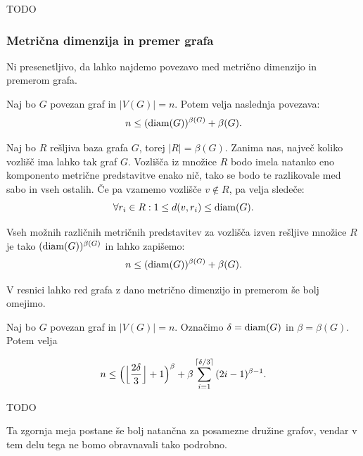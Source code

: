 \documentclass[mat1, tisk]{fmfdelo}
\newcommand{\1}{(1, 1, ..., 1)}
\newcommand{\2}{(2, 2, ..., 2)}
\begin{document}
\begin{dokaz}
    TODO
\end{dokaz}




\subsubsection{Metrična dimenzija in premer grafa} \label{ss:mdim_premer}

Ni presenetljivo, da lahko najdemo povezavo med metrično dimenzijo in premerom grafa.

\begin{trditev}\label{trd:groba_meja_mdim_premer}
    Naj bo $G$ povezan graf in $|V(G)| = n$. Potem velja naslednja povezava:
    $$n \leq ({\rm diam}(G))^{\beta (G)} + \beta (G). $$
\end{trditev}

\begin{dokaz}
    Naj bo $R$ rešljiva baza grafa $G$, torej $|R| = \beta(G).$ Zanima nas, največ koliko 
    vozlišč ima lahko tak graf $G$. Vozlišča iz množice $R$ bodo imela natanko eno 
    komponento metrične predstavitve enako nič, tako se bodo te razlikovale med sabo in 
    vseh ostalih. Če pa vzamemo vozlišče $v \notin R$, pa velja sledeče:
    $$\forall r_i \in R: 1 \leq d(v, r_i) \leq {\rm diam}(G).$$
    
    Vseh možnih različnih metričnih predstavitev za vozlišča izven rešljive množice $R$ 
    je tako $({\rm diam}(G))^{\beta (G)}$
    in lahko zapišemo:
    $$n \leq ({\rm diam}(G))^{\beta (G)} + \beta (G).$$
\end{dokaz}

V resnici lahko red grafa z dano metrično dimenzijo in premerom še bolj omejimo.

\begin{trditev} \label{trd:meja_mdim_premer}
    Naj bo $G$ povezan graf in $|V(G)| = n$. Označimo $ \delta = {\rm diam}(G)$ in 
    $\beta = \beta (G)$. Potem velja

    $$n \leq \Bigl ( \Bigl \lfloor {\frac{2 \delta}{3}}\Bigr \rfloor + 1 \Bigr )^{\beta} + 
    \beta \sum_{i = 1}^{\lceil \delta /3 \rceil} {(2i - 1)^{\beta - 1}}. $$
\end{trditev}

\begin{dokaz}
    TODO
\end{dokaz}

Ta zgornja meja postane še bolj natančna za posamezne družine grafov, vendar v tem delu
tega ne bomo obravnavali tako podrobno.
\end{document}

